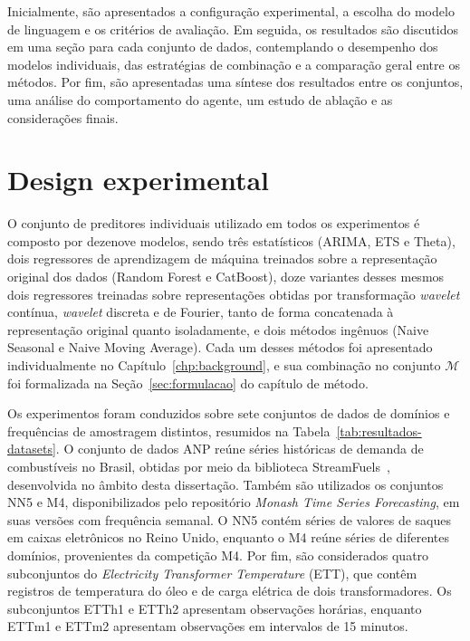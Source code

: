 Inicialmente, são apresentados a configuração experimental, a escolha do modelo de linguagem e os critérios de avaliação. Em seguida, os resultados são discutidos em uma seção para cada conjunto de dados, contemplando o desempenho dos modelos individuais, das estratégias de combinação e a comparação geral entre os métodos. Por fim, são apresentadas uma síntese dos resultados entre os conjuntos, uma análise do comportamento do agente, um estudo de ablação e as considerações finais.

\section{Design experimental} \label{sec:design-experimental}

O conjunto de preditores individuais utilizado em todos os experimentos é composto por dezenove modelos, sendo três estatísticos (ARIMA, ETS e Theta), dois regressores de aprendizagem de máquina treinados sobre a representação original dos dados (Random Forest e CatBoost), doze variantes desses mesmos dois regressores treinadas sobre representações obtidas por transformação \textit{wavelet} contínua, \textit{wavelet} discreta e de Fourier, tanto de forma concatenada à representação original quanto isoladamente, e dois métodos ingênuos (Naive Seasonal e Naive Moving Average). Cada um desses métodos foi apresentado individualmente no Capítulo~\ref{chp:background}, e sua combinação no conjunto $\mathcal{M}$ foi formalizada na Seção~\ref{sec:formulacao} do capítulo de método.

Os experimentos foram conduzidos sobre sete conjuntos de dados de domínios e frequências de amostragem distintos, resumidos na Tabela~\ref{tab:resultados-datasets}. O conjunto de dados ANP reúne séries históricas de demanda de combustíveis no Brasil, obtidas por meio da biblioteca StreamFuels~\citep{streamfuels}, desenvolvida no âmbito desta dissertação. Também são utilizados os conjuntos NN5 e M4, disponibilizados pelo repositório \textit{Monash Time Series Forecasting}, em suas versões com frequência semanal. O NN5 contém séries de valores de saques em caixas eletrônicos no Reino Unido, enquanto o M4 reúne séries de diferentes domínios, provenientes da competição M4. Por fim, são considerados quatro subconjuntos do \textit{Electricity Transformer Temperature} (ETT), que contêm registros de temperatura do óleo e de carga elétrica de dois transformadores. Os subconjuntos ETTh1 e ETTh2 apresentam observações horárias, enquanto ETTm1 e ETTm2 apresentam observações em intervalos de 15 minutos.

